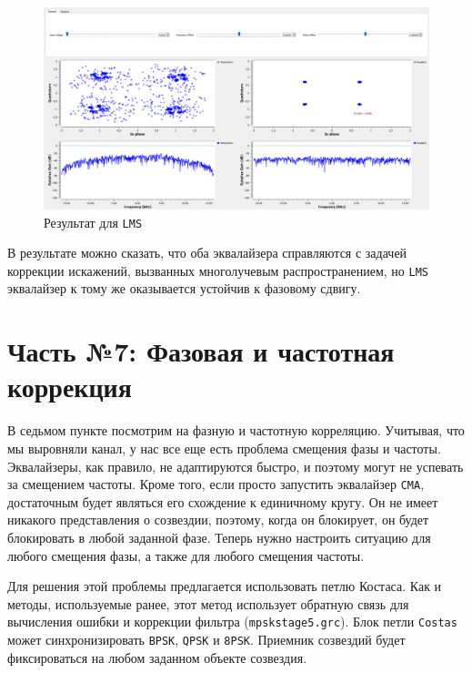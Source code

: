 \documentclass[a4paper]{article}
\begin{document}
            \begin{figure}[H]
                \centering
                \includegraphics[width=\textwidth]{img/p6_4.png}
                \caption{Результат для \texttt{LMS}}
                \label{fig:p6_4}
            \end{figure}
            
            В результате можно сказать, что оба эквалайзера справляются с задачей коррекции искажений, вызванных многолучевым распространением, но \texttt{LMS} эквалайзер к тому же оказывается устойчив к фазовому сдвигу.

    \newpage
        \section{Часть №7: Фазовая и частотная коррекция}
            В седьмом пункте посмотрим на фазную и частотную корреляцию. Учитывая, что мы выровняли канал, у нас все еще есть проблема смещения фазы и частоты. Эквалайзеры, как правило, не адаптируются быстро, и поэтому могут не успевать за смещением частоты. Кроме того, если просто запустить эквалайзер \texttt{CMA}, достаточным будет являться его схождение к единичному кругу. Он не имеет никакого представления о созвездии, поэтому, когда он блокирует, он будет блокировать в любой заданной фазе. Теперь нужно настроить ситуацию для любого смещения фазы, а также для любого смещения частоты.
            
            Для решения этой проблемы предлагается использовать петлю Костаса. Как и методы, используемые ранее, этот метод использует обратную связь для вычисления ошибки и коррекции фильтра (\texttt{mpskstage5.grc}). Блок петли \texttt{Costas} может синхронизировать \texttt{BPSK}, \texttt{QPSK} и \texttt{8PSK}. Приемник созвездий будет фиксироваться на любом заданном объекте созвездия.
            
\end{document}

